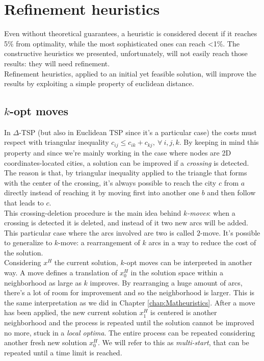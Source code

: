 \section{Refinement heuristics}

Even without theoretical guarantees, a heuristic is considered decent if it
reaches 5\% from optimality, while the most sophisticated ones  can reach <1\%.
The constructive heuristics we presented, unfortunately, will not easily reach
those results: they will need refinement. \\
Refinement heuristics, applied to an initial yet feasible solution, will improve
the results by exploiting a simple property of euclidean distance.

\subsection{$k$-opt moves}

In $\Delta$-TSP (but also in Euclidean TSP since it's a particular case) the
costs must respect with triangular inequality $c_{ij} \leq c_{ik} + c_{kj},\
\forall\ i, j, k$. By keeping in mind this  property and since we're mainly
working in the case where nodes are 2D coordinates-located cities, a solution
can be improved if a \emph{crossing} is detected. The reason is that, by
triangular inequality applied to the triangle that forms with the center of
the crossing, it's always possible to reach the city $c$ from $a$ directly instead
of reaching it by moving first into another one $b$ and then follow
that leads to $c$.\\
This crossing-deletion procedure is the main idea behind \emph{$k$-moves}:
when a crossing is detected it is deleted, and instead of it two new arcs will be
added. This particular case where the arcs involved are two is called $2$-move.
It's possible to generalize to $k$-move: a rearrangement of $k$ arcs in a way to
reduce the cost of the solution.\\

Considering $x^H$ the current solution, $k$-opt moves can be interpreted in another
way. A move defines a translation of $x^H_0$ in the solution space within a
neighborhood as large as $k$ improves. By rearranging a huge amount of arcs,
there's a lot of room for improvement and so the neighborhood is larger. This is
the same interpretation as we did in Chapter \ref{chap:Matheuristics}. After
a move has  been applied, the new current solution $x^H_1$ is centered is
another neighborhood and the process is repeated until the solution cannot be
improved no more, stuck in a \emph{local optima}. The entire process can be
repeated considering another fresh new solution $x^H_0$. We will refer to this
as \emph{multi-start}, that can be repeated until a time limit is reached.

